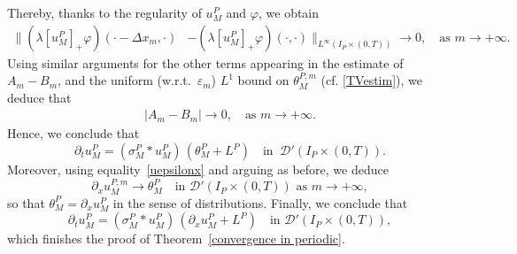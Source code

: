 \documentclass[11pt]{amsart}
\newcommand{\pa}{\partial}
\newcommand{\eps}{\varepsilon}
\begin{document}
Thereby, thanks to the regularity of $u^P_M$ and $\varphi$, we obtain
\begin{align*}
    \| (\lambda[u^P_M]_+ \varphi)(\cdot - \Delta x_m,\cdot)& - (\lambda[u^P_M]_+ \varphi)(\cdot, \cdot)\|_{L^\infty(I_P\times(0,T))} \to 0, \quad \mbox{as }m\to+\infty.
\end{align*}
Using similar arguments for the other terms appearing in the estimate of $A_m-B_m$, and the uniform (w.r.t.~$\eps_m$) $L^1$ bound on $\theta^{P,m}_M$ (cf. \eqref{TVestim}), we deduce that
\begin{align*}
    |A_m-B_m| \to 0, \quad \mbox{as }m \to +\infty.
\end{align*}
Hence, we conclude that
 \begin{equation*}
    \partial_t u^P_M = \left(\sigma_M^P \ast u^P_M\right) \, \left(\theta^P_M + L^P\right) \quad \mbox{in } \ \mathcal{D}'(I_P \times (0, T)).
 \end{equation*}
 Moreover, using equality~\eqref{uepsilonx} and arguing as before, we deduce 
 \[
 \partial_x u^{P, m}_M\rightarrow \theta^P_M \quad \mbox{in } \mathcal{D}'(I_P\times (0, T)) \mbox{ as }m\to +\infty,
 \]
 so that $\theta^P_M = \partial_x u^P_M$ in the sense of distributions. Finally, we conclude that
 \[
 \partial_t u^P_M = \left(\sigma_M^P\ast u^P_M\right) \, \left(\pa_x u^P_M + L^P\right) \quad  \mbox{in } \mathcal{D}'(I_P\times(0, T)),
 \]
 which finishes the proof of Theorem~\ref{convergence in periodic}.
    
\end{document}
